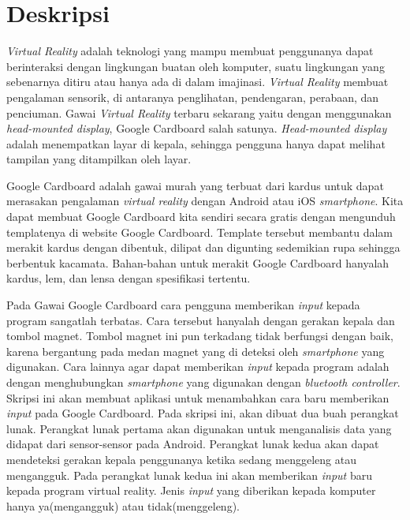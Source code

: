 \documentclass[a4paper,twoside]{article}
\begin{document}
\title{\@judultopik}
\author{\nama \textendash \@npm} 

\newcommand{\nama}{Ega Prianto}
\newcommand{\@npm}{2013730047}
\newcommand{\@judultopik}{Deteksi Gerakan Kepala dengan Google Cardboard} %
\newcommand{\jumpemb}{1} %
\newcommand{\tanggal}{05/09/2016}
\maketitle


\section{Deskripsi}
\textit{Virtual Reality} adalah teknologi yang mampu membuat penggunanya dapat berinteraksi dengan lingkungan buatan oleh komputer, suatu lingkungan yang sebenarnya ditiru atau hanya ada di dalam imajinasi. \textit{Virtual Reality} membuat pengalaman sensorik, di antaranya penglihatan, pendengaran, perabaan, dan penciuman. Gawai \textit{Virtual Reality} terbaru sekarang yaitu dengan menggunakan \textit{head-mounted display}, Google Cardboard salah satunya. \textit{Head-mounted display} adalah menempatkan layar di kepala, sehingga pengguna hanya dapat melihat tampilan yang ditampilkan oleh layar.

Google Cardboard adalah gawai murah yang terbuat dari kardus untuk dapat merasakan pengalaman \textit{virtual reality} dengan Android atau iOS \textit{smartphone}. Kita dapat membuat Google Cardboard kita sendiri secara gratis dengan mengunduh templatenya di website Google Cardboard. Template tersebut membantu dalam merakit kardus dengan dibentuk, dilipat dan digunting sedemikian rupa sehingga berbentuk kacamata. Bahan-bahan untuk merakit Google Cardboard hanyalah kardus, lem, dan lensa dengan spesifikasi tertentu.

Pada Gawai Google Cardboard cara pengguna memberikan \textit{input} kepada program sangatlah terbatas. Cara tersebut hanyalah dengan gerakan kepala dan tombol magnet. Tombol magnet ini pun terkadang tidak berfungsi dengan baik, karena bergantung pada medan magnet yang di deteksi oleh \textit{smartphone} yang digunakan. Cara lainnya agar dapat memberikan \textit{input} kepada program adalah dengan menghubungkan \textit{smartphone} yang digunakan dengan \textit{bluetooth controller}. 
Skripsi ini akan membuat aplikasi untuk menambahkan cara baru  memberikan \textit{input} pada Google Cardboard. Pada skripsi ini, akan dibuat dua buah perangkat lunak. Perangkat lunak pertama akan digunakan untuk menganalisis data yang didapat dari sensor-sensor pada Android. Perangkat lunak kedua akan dapat mendeteksi gerakan kepala penggunanya ketika sedang menggeleng atau mengangguk. Pada perangkat lunak kedua ini akan memberikan \textit{input} baru kepada program virtual reality. Jenis \textit{input} yang diberikan kepada komputer hanya ya(mengangguk) atau tidak(menggeleng).
\end{document}
